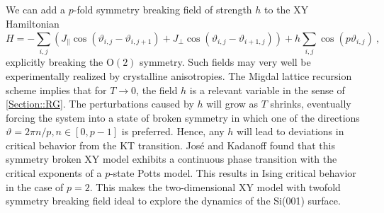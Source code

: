 	We can add a $p$-fold symmetry breaking field of strength $h$ to the XY Hamiltonian
	\begin{equation} \label{Eq::XY-Hamilton-Field}
		H =- \sum_{i,j}^{} \left(J_\parallel  \cos \left(\vartheta_{i,j} - \vartheta_{i, j+1} \right) + J_\perp  \cos \left(\vartheta_{i,j} - \vartheta_{i+1, j} \right) \right)	+ h \sum_{i,j} \cos(p\vartheta_{i,j}) ~,
	\end{equation}
	explicitly breaking the $\text{O}(2)$ symmetry. Such fields may very well be experimentally realized by crystalline anisotropies. The Migdal lattice recursion scheme \cite{migdal1975phase} implies that for $T \rightarrow 0$, the field $h$ is a relevant variable in the sense of \autoref{Section::RG}. The perturbations caused by $h$ will grow as $T$ shrinks, eventually forcing the system into a state of broken symmetry in which one of the directions $\vartheta =	{2 \pi n }/{p}, n \in \left[0, p-1\right]$ is preferred. Hence, any $h$ will lead to deviations in critical behavior from the KT transition. José and Kadanoff \cite{jose1977renormalization} found that this symmetry broken XY model exhibits a continuous phase transition with the critical exponents of a $p$-state Potts model. This results in Ising critical behavior in the case of $p=2$. This makes the two-dimensional XY model with twofold symmetry breaking field ideal to explore the dynamics of the Si(001) surface.
